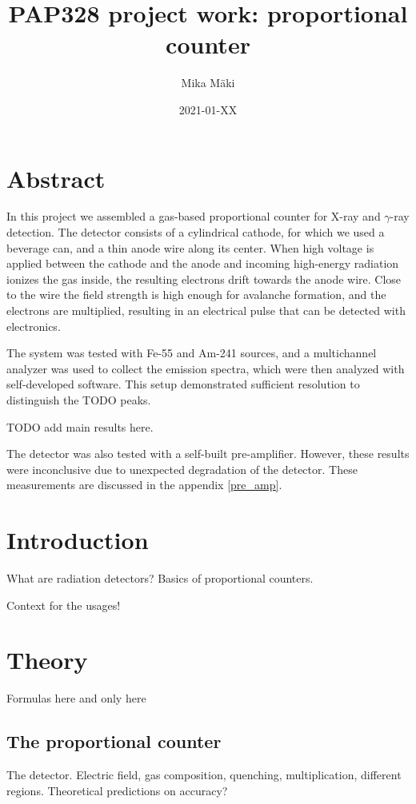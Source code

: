 \documentclass[a4paper]{article}
\title{PAP328 project work: proportional counter}
\author{Mika Mäki}
\date{2021-01-XX}
\begin{document}
\maketitle

\section*{Abstract}
In this project we assembled a gas-based proportional counter for X-ray and $\gamma$-ray detection.
The detector consists of a cylindrical cathode, for which we used a beverage can, and a thin anode wire along its center.
When high voltage is applied between the cathode and the anode and incoming high-energy radiation ionizes the gas inside, the resulting electrons drift towards the anode wire.
Close to the wire the field strength is high enough for avalanche formation, and the electrons are multiplied, resulting in an electrical pulse that can be detected with electronics.

The system was tested with Fe-55 and Am-241 sources, and a multichannel analyzer was used to collect the emission spectra, which were then analyzed with self-developed software.
This setup demonstrated sufficient resolution to distinguish the TODO peaks.

TODO add main results here.

The detector was also tested with a self-built pre-amplifier.
However, these results were inconclusive due to unexpected degradation of the detector.
These measurements are discussed in the appendix \ref{pre_amp}.

\tableofcontents


\section{Introduction}
\label{introduction}
What are radiation detectors?
Basics of proportional counters.

Context for the usages!


\section{Theory}
\label{theory}
Formulas here and only here


\subsection{The proportional counter}
\label{counter}
The detector.
Electric field, gas composition, quenching, multiplication, different regions.
Theoretical predictions on accuracy?
\end{document}
